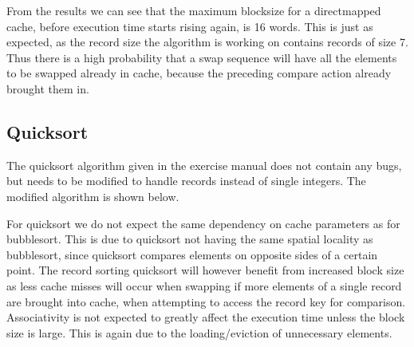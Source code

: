 From the results we can see that the maximum blocksize for a directmapped cache, before execution time starts rising again, is 
16 words. This is just as expected, as the record size the algorithm is working on contains records of size 7.
Thus there is a high probability that a swap sequence will have all the elements to be swapped already in cache,
because the preceding compare action already brought them in.

\subsection{Quicksort}
The quicksort algorithm given in the exercise manual does not contain any bugs, but needs to be modified to handle records instead
of single integers. The modified algorithm is shown below.

For quicksort we do not expect the same dependency on cache parameters as for bubblesort. This is due to quicksort not 
having the same spatial locality as bubblesort, since quicksort compares elements on opposite sides of a certain point. 
The record sorting quicksort will however benefit from increased block size as less cache misses will occur when swapping if
more elements of a single record are brought into cache, when attempting to access the record key for comparison. Associativity is
not expected to greatly affect the execution time unless the block size is large. This is again due to the loading/eviction of 
unnecessary elements.

